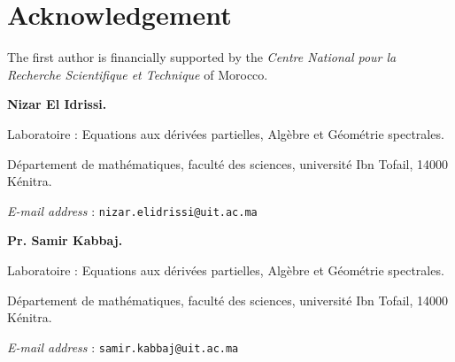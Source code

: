 \documentclass[a4paper,11pt]{article}
\makeatletter
\newcommand{\Addresses}{{%
  \bigskip
  \footnotesize

  \textbf{Nizar El Idrissi.}
  \par\nopagebreak Laboratoire : Equations aux dérivées partielles, Algèbre et Géométrie spectrales.
  \par\nopagebreak
  Département de mathématiques, faculté des sciences, université Ibn Tofail, 14000 Kénitra.\par\nopagebreak 
  \textit{E-mail address} : \texttt{nizar.elidrissi@uit.ac.ma}

  \medskip

  \textbf{Pr. Samir Kabbaj.} \par\nopagebreak Laboratoire : Equations aux dérivées partielles, Algèbre et Géométrie spectrales.
  \par\nopagebreak
  Département de mathématiques, faculté des sciences, université Ibn Tofail, 14000 Kénitra.\par\nopagebreak 
  \textit{E-mail address} : \texttt{samir.kabbaj@uit.ac.ma}
  
}}
\theoremstyle{plain}
\theoremstyle{definition}
\theoremstyle{remark}
\makeatother
\begin{document}
\section*{Acknowledgement}
The first author is financially supported by the \textit{Centre National pour la Recherche Scientifique et Technique} of Morocco.


\nocite{*}





\Addresses
\end{document}
